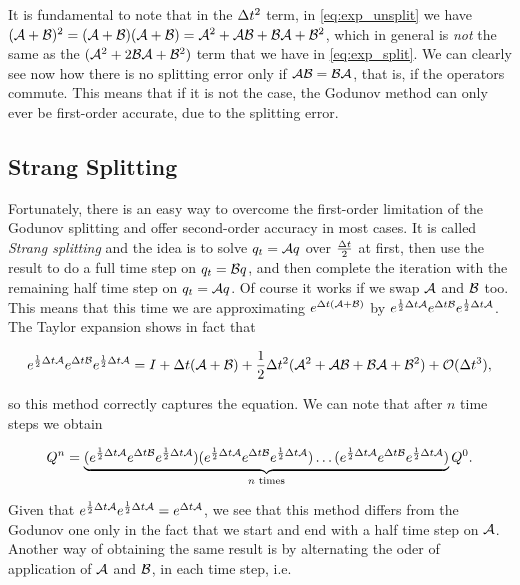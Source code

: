 \documentclass[journal,onecolumn]{IEEEtran}
\begin{document}
It is fundamental to note that in the $\Delta t^2$ term, in \eqref{eq:exp_unsplit} we have $(\mathcal{A} +\mathcal{B})^2=(\mathcal{A} +\mathcal{B})(\mathcal{A} +\mathcal{B})=\mathcal{A}^2+\mathcal{A}\mathcal{B}+\mathcal{B}\mathcal{A}+\mathcal{B}^2$, which in general is \textit{not} the same as the $(\mathcal{A}^2+2\mathcal{B}\mathcal{A}+\mathcal{B}^2)$ term that we have in \eqref{eq:exp_split}. We can clearly see now how there is no splitting error only if $\mathcal{A}\mathcal{B}=\mathcal{B}\mathcal{A}$, that is, if the operators commute. This means that if it is not the case, the Godunov method can only ever be first-order accurate, due to the splitting error.

\subsection{Strang Splitting}

Fortunately, there is an easy way to overcome the first-order limitation of the Godunov splitting and offer second-order accuracy in most cases. It is called \textit{Strang splitting} and the idea is to solve $q_t=\mathcal{A} q$ over $\frac{\Delta t}{2}$ at first, then use the result to do a full time step on $q_t=\mathcal{B} q$, and then complete the iteration with the remaining half time step on $q_t=\mathcal{A} q$. Of course it works if we swap $\mathcal{A}$ and $\mathcal{B}$ too. This means that this time we are approximating $e^{\Delta t(\mathcal{A} +\mathcal{B})}$ by $e^{\frac{1}{2}\Delta t\mathcal{A}}e^{\Delta t\mathcal{B}}e^{\frac{1}{2}\Delta t\mathcal{A}}$. The Taylor expansion shows in fact that

\begin{equation}
	e^{\frac{1}{2}\Delta t\mathcal{A}}e^{\Delta t\mathcal{B}}e^{\frac{1}{2}\Delta t\mathcal{A}} = I+\Delta t(\mathcal{A} + \mathcal{B})+\frac{1}{2}\Delta t^2(\mathcal{A}^2+\mathcal{A}\mathcal{B}+\mathcal{B}\mathcal{A}+\mathcal{B}^2)+\mathcal{O}(\Delta t^3),
\end{equation}

so this method correctly captures the equation. We can note that after $n$ time steps we obtain

\begin{equation}\label{eq:recursion}
	Q^n = \underbrace{(e^{\frac{1}{2}\Delta t\mathcal{A}}e^{\Delta t\mathcal{B}}e^{\frac{1}{2}\Delta t\mathcal{A}})(e^{\frac{1}{2}\Delta t\mathcal{A}}e^{\Delta t\mathcal{B}}e^{\frac{1}{2}\Delta t\mathcal{A}})\dots(e^{\frac{1}{2}\Delta t\mathcal{A}}e^{\Delta t\mathcal{B}}e^{\frac{1}{2}\Delta t\mathcal{A}})}_{n\text{ times}}Q^0.
\end{equation}

Given that $e^{\frac{1}{2}\Delta t\mathcal{A}}e^{\frac{1}{2}\Delta t\mathcal{A}} = e^{\Delta t\mathcal{A}}$, we see that this method differs from the Godunov one only in the fact that we start and end with a half time step on $\mathcal{A}$. Another way of obtaining the same result is by alternating the oder of application of $\mathcal{A}$ and $\mathcal{B}$, in each time step, i.e.
\end{document}
